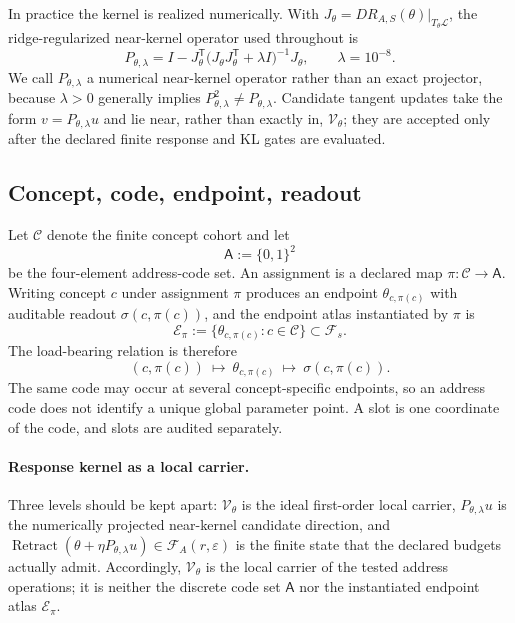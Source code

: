\documentclass[11pt]{article}
\begin{document}
In practice the kernel is realized numerically. With $J_\theta=DR_{A,S}(\theta)\big|_{T_\theta\mathcal{L}}$, the
ridge-regularized near-kernel operator used throughout is
\begin{equation}
P_{\theta,\lambda}=I-J_\theta^{\mathsf{T}}\bigl(J_\theta J_\theta^{\mathsf{T}}+\lambda I\bigr)^{-1}J_\theta,
\qquad \lambda=10^{-8}.
\end{equation}
We call $P_{\theta,\lambda}$ a numerical near-kernel operator rather than an exact projector, because
$\lambda>0$ generally implies $P_{\theta,\lambda}^2\neq P_{\theta,\lambda}$. Candidate tangent updates take the
form $v=P_{\theta,\lambda}u$ and lie near, rather than exactly in, $\mathcal{V}_\theta$; they are accepted only
after the declared finite response and KL gates are evaluated.

\subsection{Concept, code, endpoint, readout}

Let $\mathcal{C}$ denote the finite concept cohort and let
\begin{equation}
\mathsf{A}:=\{0,1\}^2
\end{equation}
be the four-element address-code set. An assignment is a declared map $\pi:\mathcal{C}\to\mathsf{A}$. Writing
concept $c$ under assignment $\pi$ produces an endpoint $\theta_{c,\pi(c)}$ with auditable readout
$\sigma(c,\pi(c))$, and the endpoint atlas instantiated by $\pi$ is
\begin{equation}
\mathcal{E}_\pi:=\bigl\{\theta_{c,\pi(c)}:c\in\mathcal{C}\bigr\}\subset\mathcal{F}_s .
\end{equation}
The load-bearing relation is therefore
\begin{equation}
(c,\pi(c))\ \longmapsto\ \theta_{c,\pi(c)}\ \longmapsto\ \sigma(c,\pi(c)).
\end{equation}
The same code may occur at several concept-specific endpoints, so an address code does not identify a unique
global parameter point. A slot is one coordinate of the code, and slots are audited separately.

\paragraph{Response kernel as a local carrier.}
Three levels should be kept apart: $\mathcal{V}_\theta$ is the ideal first-order local carrier,
$P_{\theta,\lambda}u$ is the numerically projected near-kernel candidate direction, and
$\operatorname{Retract}(\theta+\eta P_{\theta,\lambda}u)\in\mathcal{F}_A(r,\varepsilon)$ is the finite state
that the declared budgets actually admit. Accordingly, $\mathcal{V}_\theta$ is the local carrier of the tested
address operations; it is neither the discrete code set $\mathsf{A}$ nor the instantiated endpoint atlas
$\mathcal{E}_\pi$.
\end{document}
